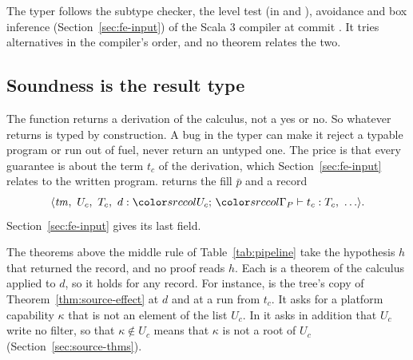The typer follows the subtype checker, the level test (in \treeCC and \treeCL), avoidance and box inference (Section~\ref{sec:fe-input}) of the Scala 3 compiler at commit  \cite{scala3cc}. It tries alternatives in the compiler's order, and no theorem relates the two.

\subsection{Soundness is the result type}\label{sec:fe-sound}

The function  returns a derivation of the calculus, not a yes or no. So whatever  returns is typed by construction. A bug in the typer can make it reject a typable program or run out of fuel, never return an untyped one. The price is that every guarantee is about the term $t_c$ of the derivation, which Section~\ref{sec:fe-input} relates to the written program.  returns the fill $\bar{p}$ and a record
\[
\langle \mathit{tm},\ U_c,\ T_c,\ d : \dtyuj{U_c}{\platctx}{t_c}{T_c},\ \ldots \rangle .
\]
Section~\ref{sec:fe-input} gives its last field.

The theorems above the middle rule of Table~\ref{tab:pipeline} take the hypothesis $h$ that  returned the record, and no proof reads $h$. Each is a theorem of the calculus applied to $d$, so it holds for any record. For instance,  is the tree's copy of Theorem~\ref{thm:source-effect} at $d$ and at a run from $t_c$. It asks for a platform capability $\kappa$ that is not an element of the list $U_c$. In \treeCL it asks in addition that $U_c$ write no filter, so that $\kappa \notin U_c$ means that $\kappa$ is not a root of $U_c$ (Section~\ref{sec:source-thms}).

